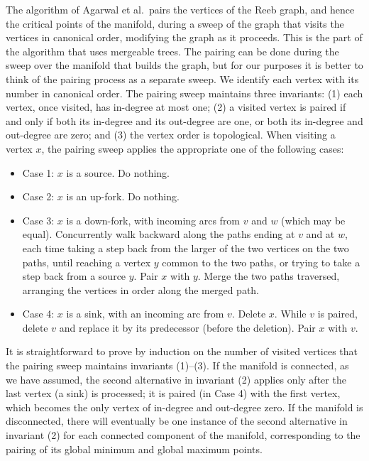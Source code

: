 \documentclass[twoside,leqno,twocolumn]{article}
\begin{document}
The algorithm of Agarwal et al.\ pairs the vertices of the Reeb graph, and hence the critical points of the manifold, during a sweep of the graph that visits the vertices in canonical order, modifying the graph as it proceeds.  This is the part of the algorithm that uses mergeable trees.  The pairing can be done during the sweep over the manifold that builds the graph, but for our purposes it is better to think of the pairing process as a separate sweep.  We identify each vertex with its number in canonical order.  The pairing sweep maintains three invariants: (1) each vertex, once visited, has in-degree at most one; (2) a visited vertex is paired if and only if both its in-degree and its out-degree are one, or both its in-degree and out-degree are zero; and (3) the vertex order is topological.  When visiting a vertex $x$, the pairing sweep applies the appropriate one of the following cases:
\begin{itemize}
\item Case 1: $x$ is a source. Do nothing.
\item Case 2: $x$ is an up-fork. Do nothing.
\item Case 3: $x$ is a down-fork, with incoming arcs from $v$ and $w$ (which may be equal).  Concurrently walk backward along the paths ending at $v$ and at $w$, each time taking a step back from the larger of the two vertices on the two paths, until reaching a vertex $y$ common to the two paths, or trying to take a step back from a source $y$.  Pair $x$ with $y$.  Merge the two paths traversed, arranging the vertices in order along the merged path.
\item Case 4: $x$ is a sink, with an incoming arc from $v$.  Delete $x$.  While $v$ is paired, delete $v$ and replace it by its predecessor (before the deletion).  Pair $x$ with $v$.
\end{itemize}

It is straightforward to prove by induction on the number of visited vertices that the pairing sweep maintains invariants (1)--(3).  If the manifold is connected, as we have assumed, the second alternative in invariant (2) applies only after the last vertex (a sink) is processed; it is paired (in Case 4) with the first vertex, which becomes the only vertex of in-degree and out-degree zero.  If the manifold is disconnected, there will eventually be one instance of the second alternative in invariant (2) for each connected component of the manifold, corresponding to the pairing of its global minimum and global maximum points.
\end{document}
